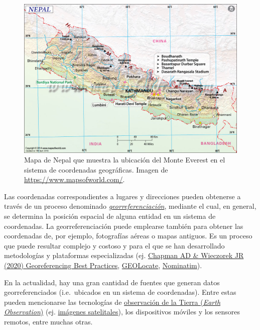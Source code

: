 \documentclass[
  letterpaper,
  DIV=11,
  numbers=noendperiod]{scrreprt}
\begin{document}
\begin{figure}

{\centering \includegraphics{./img/nepal-map.jpg}

}

\caption{\label{fig-mapa-nepal-everest}Mapa de Nepal que muestra la
ubicación del Monte Everest en el sistema de coordenadas geográficas.
Imagen de \url{https://www.mapsofworld.com/}.}

\end{figure}

Las coordenadas correspondientes a lugares y direcciones pueden
obtenerse a través de un proceso denominado
\href{https://es.wikipedia.org/wiki/Georreferenciaci\%C3\%B3n}{\emph{georreferenciación}},
mediante el cual, en general, se determina la posición espacial de
alguna entidad en un sistema de coordenadas. La georreferenciación puede
emplearse también para obtener las coordenadas de, por ejemplo,
fotografías aéreas o mapas antiguos. Es un proceso que puede resultar
complejo y costoso y para el que se han desarrollado metodologías y
plataformas especializadas (ej.
\href{https://doi.org/10.15468/doc-gg7h-s853}{Chapman AD \& Wieczorek JR
(2020) Georeferencing Best Practices},
\href{https://www.geo-locate.org/}{GEOLocate},
\href{https://nominatim.openstreetmap.org/ui/search.html}{Nominatim}).

En la actualidad, hay una gran cantidad de fuentes que generan datos
georreferenciados (i.e.~ubicados en un sistema de coordenadas). Entre
estas pueden mencionarse las tecnologías de
\href{https://ec.europa.eu/jrc/en/research-topic/earth-observation}{observación
de la Tierra (\emph{Earth Observation})} (ej.
\href{https://es.wikipedia.org/wiki/Imagen_satelital}{imágenes
satelitales}), los dispositivos móviles y los sensores remotos, entre
muchas otras.
\end{document}
